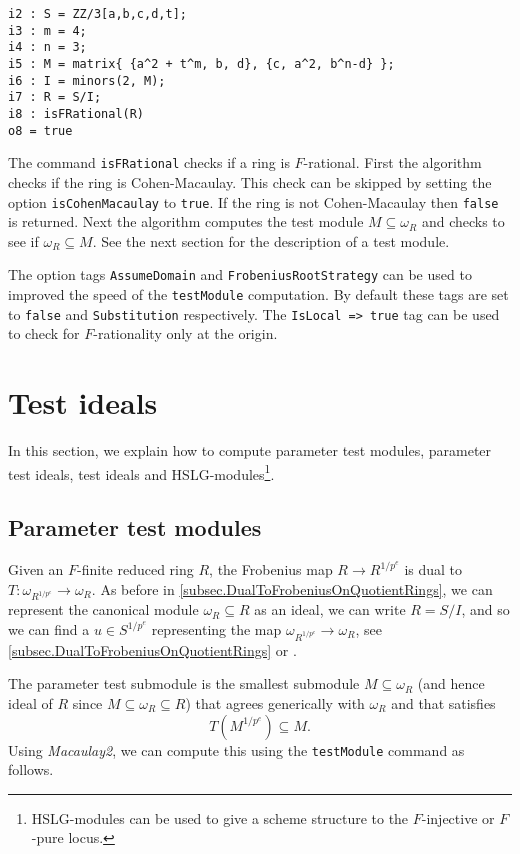\documentclass{amsart}
\begin{document}
\medskip
\begin{verbatim}
i2 : S = ZZ/3[a,b,c,d,t];
i3 : m = 4;
i4 : n = 3;
i5 : M = matrix{ {a^2 + t^m, b, d}, {c, a^2, b^n-d} };
i6 : I = minors(2, M);
i7 : R = S/I;
i8 : isFRational(R)
o8 = true
\end{verbatim}
\medskip


The command \texttt{isFRational} checks if a ring is $F$-rational. First the
algorithm checks if the ring is Cohen-Macaulay.
This check can be skipped by setting the option \texttt{isCohenMacaulay} to \texttt{true}. If the ring
is not Cohen-Macaulay then \texttt{false} is returned. Next the algorithm
computes the test module $M \subseteq \omega_{R}$ and checks to see if
$\omega_{R} \subseteq M$.  See the next section for the description of a test module.


The option tags \texttt{AssumeDomain} and \texttt{FrobeniusRootStrategy} can be
used to improved the speed of the \texttt{testModule} computation. By default
these tags are set to \texttt{false} and \texttt{Substitution} respectively. The
\texttt{IsLocal => true} tag can be used to check for $F$-rationality only at
the origin.


\section{Test ideals}\label{Section: Test Ideals}

In this section, we explain how to compute parameter test modules, parameter test ideals, test ideals and HSLG-modules\footnote{HSLG-modules can be used to give a scheme structure to the $F$-injective or $F$-pure locus.}.

\subsection{Parameter test modules}

Given an $F$-finite reduced ring $R$, the Frobenius map $R \to R^{1/p^e}$ is dual to $T : \omega_{R^{1/p^e}} \to \omega_R$.  As before in \autoref{subsec.DualToFrobeniusOnQuotientRings}, we can represent the canonical module $\omega_R \subseteq R$ as an ideal, we can write $R = S/I$, and so we can find a $u \in S^{1/p^e}$ representing the map $\omega_{R^{1/p^e}} \to \omega_R$, see \autoref{subsec.DualToFrobeniusOnQuotientRings} or \cite{KatzmanParameterTestIdealOfCMRings}.  

The parameter test submodule is the smallest submodule $M \subseteq \omega_R$ (and hence ideal of $R$ since $M \subseteq \omega_R \subseteq R$) that agrees generically with $\omega_R$ and that satisfies
\[
T (M^{1/p^e}) \subseteq M.
\]
Using \emph{Macaulay2}, we can compute this using the \texttt{testModule} command as follows.
\end{document}
